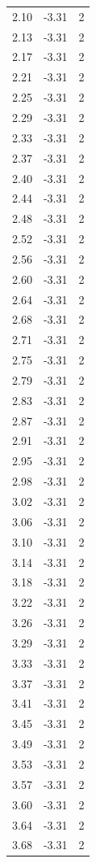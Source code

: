 \begin{longtable}{lrr}
  2.10 & -3.31 & 2 \\
  2.13 & -3.31 & 2 \\
  2.17 & -3.31 & 2 \\
  2.21 & -3.31 & 2 \\
  2.25 & -3.31 & 2 \\
  2.29 & -3.31 & 2 \\
  2.33 & -3.31 & 2 \\
  2.37 & -3.31 & 2 \\
  2.40 & -3.31 & 2 \\
  2.44 & -3.31 & 2 \\
  2.48 & -3.31 & 2 \\
  2.52 & -3.31 & 2 \\
  2.56 & -3.31 & 2 \\
  2.60 & -3.31 & 2 \\
  2.64 & -3.31 & 2 \\
  2.68 & -3.31 & 2 \\
  2.71 & -3.31 & 2 \\
  2.75 & -3.31 & 2 \\
  2.79 & -3.31 & 2 \\
  2.83 & -3.31 & 2 \\
  2.87 & -3.31 & 2 \\
  2.91 & -3.31 & 2 \\
  2.95 & -3.31 & 2 \\
  2.98 & -3.31 & 2 \\
  3.02 & -3.31 & 2 \\
  3.06 & -3.31 & 2 \\
  3.10 & -3.31 & 2 \\
  3.14 & -3.31 & 2 \\
  3.18 & -3.31 & 2 \\
  3.22 & -3.31 & 2 \\
  3.26 & -3.31 & 2 \\
  3.29 & -3.31 & 2 \\
  3.33 & -3.31 & 2 \\
  3.37 & -3.31 & 2 \\
  3.41 & -3.31 & 2 \\
  3.45 & -3.31 & 2 \\
  3.49 & -3.31 & 2 \\
  3.53 & -3.31 & 2 \\
  3.57 & -3.31 & 2 \\
  3.60 & -3.31 & 2 \\
  3.64 & -3.31 & 2 \\
  3.68 & -3.31 & 2 \\

\end{longtable}
